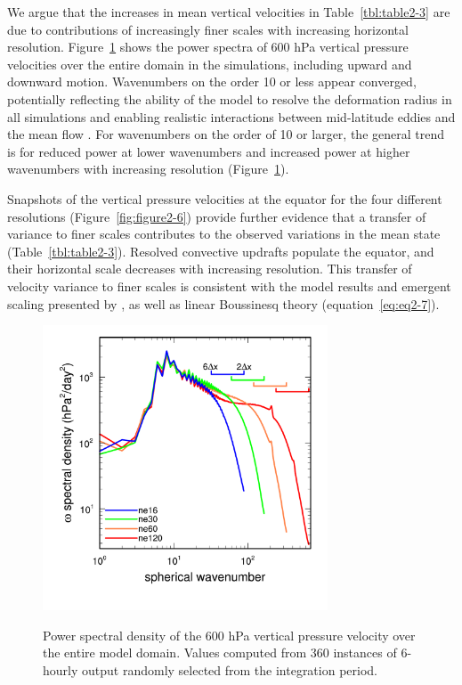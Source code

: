 We argue that the increases in mean vertical velocities in Table~\ref{tbl:table2-3} are due to contributions of increasingly finer scales with increasing horizontal resolution. Figure~\ref{fig:figure2-5} shows the power spectra of 600 hPa vertical pressure velocities over the entire domain in the simulations, including upward and downward motion. Wavenumbers on the order 10 or less appear converged, potentially reflecting the ability of the model to resolve the deformation radius in all simulations and enabling realistic interactions between mid-latitude eddies and the mean flow \citep{W1999T,DV2000JCLIM,ZGETAL2015JAMES}. For wavenumbers on the order of 10 or larger, the general trend is for reduced power at lower wavenumbers and increased power at higher wavenumbers with increasing resolution (Figure~\ref{fig:figure2-5}). 

Snapshots of the vertical pressure velocities at the equator for the four different resolutions (Figure~\ref{fig:figure2-6}) provide further evidence that a transfer of variance to finer scales contributes to the observed variations in the mean state (Table~\ref{tbl:table2-3}). Resolved convective updrafts populate the equator, and their horizontal scale decreases with increasing resolution. This transfer of velocity variance to finer scales is consistent with the model results and emergent scaling presented by \cite{RETAL2016CD}, as well as linear Boussinesq theory (equation~\ref{eq:eq2-7}).

\begin{figure}[t]
\begin{center}
\noindent\includegraphics[width=20pc,angle=0]{chapter2/figure5.pdf}\\
\end{center}
\caption{Power spectral density of the 600 hPa vertical pressure velocity over the entire model domain. Values computed from 360 instances of 6-hourly output randomly selected from the integration period.}
\label{fig:figure2-5}
\end{figure}

